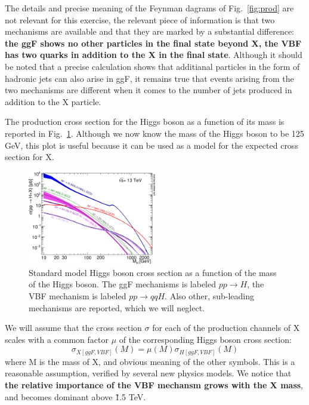 \documentclass[a4paper,12pt]{article}
\begin{document}
The details and precise meaning of the Feynman dagrams of Fig.~\ref{fig:prod}
are not relevant for this exercise, the relevant piece of information is that
two mechanisms are available and that they are marked by a substantial
difference: {\bf the ggF shows no other particles in the final state beyond X,
the VBF has two quarks in addition to the X in the final state}.
Although it should be noted that a precise calculation shows that additianal
particles in the form of hadronic jets can also arise in ggF, it remains true
that events arising from the two mechanisms are different when it comes to the
number of jets produced in addition to the X particle.

The production cross section for the Higgs boson as a function of its mass is
reported in Fig.~\ref{fig:production}. Although we now know the mass of the
Higgs boson to be 125 GeV, this plot is useful because it can be used as a
model for the expected cross section for X.
\begin{figure}
 \centering 
 \includegraphics[width=0.5\textwidth]{images/plotAll_13tev_BSM_sqrt.png}
 \caption{Standard model Higgs boson cross section as a function of the mass
 of the Higgs boson. The ggF mechanisms is labeled $pp\rightarrow{}H$, the VBF
 mechanism is labeled $pp\rightarrow{}qqH$. Also other, sub-leading mechanisms
 are reported, which we will neglect.\label{fig:production}}
\end{figure}

We will assume that the cross section $\sigma$ for each of the production
channels of X scales with a common factor $\mu$ of the corresponding Higgs
boson cross section: \begin{equation}
 \sigma_{X [ggF,VBF]}(M) = \mu(M)\sigma_{H [ggF,VBF]}(M)
\end{equation}
 where M is the mass of X, and obvious meaning of the other symbols. This is a
 reasonable assumption, verified by several new physics models.  We notice
 that {\bf the relative importance of the VBF mechansm grows with the X mass},
 and becomes dominant above \~1.5 TeV.
 
\end{document}
